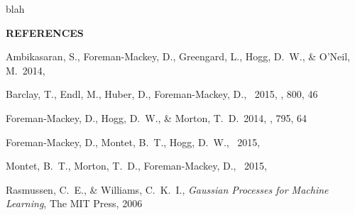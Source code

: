 \documentclass[letterpaper,12pt,preprint]{hack_aastex}
\begin{document}
blah



\begin{multicols}{2}
{\centering\bf REFERENCES\par}
\vspace{0.2em}
\begin{thebibliography}{}%
\raggedright\raggedbottom\scriptsize\setlength{\parskip}{-0.5em}%

Ambikasaran, S., Foreman-Mackey, D., Greengard, L., Hogg, D.~W.,
\& O'Neil, M.\ 2014, 

Barclay, T., Endl, M., Huber, D., Foreman-Mackey, D., \etal\ 2015, \apj, 800,
46

Foreman-Mackey, D., Hogg, D.~W., \& Morton, T.~D.\ 2014, \apj, 795, 64

Foreman-Mackey, D., Montet, B.~T., Hogg, D.~W., \etal\ 2015, 

Montet, B.~T., Morton, T.~D., Foreman-Mackey, D., \etal\ 2015,

Rasmussen, C.~E., \& Williams, C.~K.~I., \emph{Gaussian Processes for Machine
Learning}, The MIT Press, 2006

\end{thebibliography}
\end{multicols}
\end{document}
